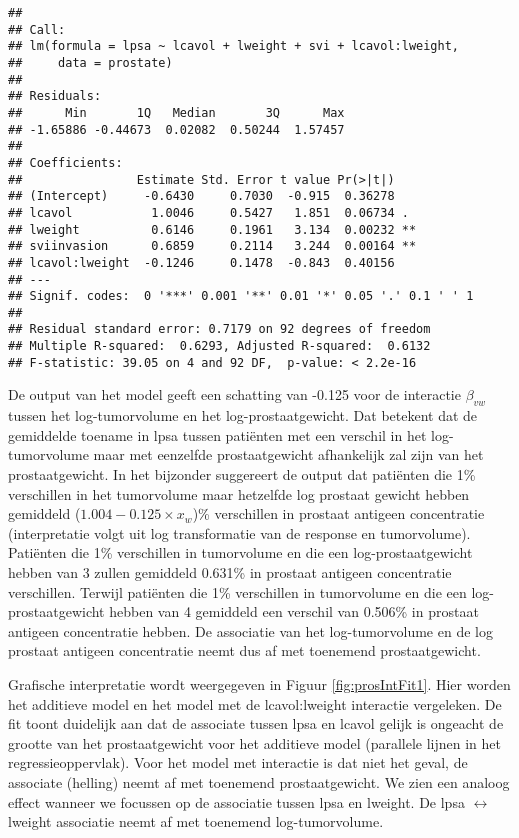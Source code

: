 \documentclass[
  12pt,dutch,coursenotes]{book}
\theoremstyle{definition}
\theoremstyle{definition}
\theoremstyle{definition}
\theoremstyle{remark}
\begin{document}
\begin{verbatim}
## 
## Call:
## lm(formula = lpsa ~ lcavol + lweight + svi + lcavol:lweight, 
##     data = prostate)
## 
## Residuals:
##      Min       1Q   Median       3Q      Max 
## -1.65886 -0.44673  0.02082  0.50244  1.57457 
## 
## Coefficients:
##                Estimate Std. Error t value Pr(>|t|)   
## (Intercept)     -0.6430     0.7030  -0.915  0.36278   
## lcavol           1.0046     0.5427   1.851  0.06734 . 
## lweight          0.6146     0.1961   3.134  0.00232 **
## sviinvasion      0.6859     0.2114   3.244  0.00164 **
## lcavol:lweight  -0.1246     0.1478  -0.843  0.40156   
## ---
## Signif. codes:  0 '***' 0.001 '**' 0.01 '*' 0.05 '.' 0.1 ' ' 1
## 
## Residual standard error: 0.7179 on 92 degrees of freedom
## Multiple R-squared:  0.6293, Adjusted R-squared:  0.6132 
## F-statistic: 39.05 on 4 and 92 DF,  p-value: < 2.2e-16
\end{verbatim}

De output van het model geeft een schatting van -0.125 voor de interactie \(\beta_{vw}\) tussen het log-tumorvolume en het log-prostaatgewicht. Dat betekent dat de gemiddelde toename in lpsa tussen patiënten met een verschil in het log-tumorvolume maar met eenzelfde prostaatgewicht afhankelijk zal zijn van het prostaatgewicht.
In het bijzonder suggereert de output dat patiënten die 1\% verschillen in het tumorvolume maar hetzelfde log prostaat gewicht hebben gemiddeld (\(1.004-0.125 \times x_w\))\% verschillen in prostaat antigeen concentratie (interpretatie volgt uit log transformatie van de response en tumorvolume).
Patiënten die 1\% verschillen in tumorvolume en die een log-prostaatgewicht hebben van 3 zullen gemiddeld 0.631\% in prostaat antigeen concentratie verschillen. Terwijl patiënten die 1\% verschillen in tumorvolume en die een log-prostaatgewicht hebben van 4 gemiddeld een verschil van 0.506\% in prostaat antigeen concentratie hebben. De associatie van het log-tumorvolume en de log prostaat antigeen concentratie neemt dus af met toenemend prostaatgewicht.

Grafische interpretatie wordt weergegeven in Figuur \ref{fig:prosIntFit1}. Hier worden het additieve model en het model met de lcavol:lweight interactie vergeleken. De fit toont duidelijk aan dat de associate tussen lpsa en lcavol gelijk is ongeacht de grootte van het prostaatgewicht voor het additieve model (parallele lijnen in het regressieoppervlak). Voor het model met interactie is dat niet het geval, de associate (helling) neemt af met toenemend prostaatgewicht. We zien een analoog effect wanneer we focussen op de associatie tussen lpsa en lweight. De lpsa \(\leftrightarrow\) lweight associatie neemt af met toenemend log-tumorvolume.
\end{document}
